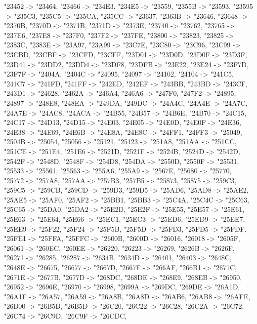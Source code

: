 {  "23452 -> "23464,
  "23466 -> "234E3,
  "234E5 -> "23559,
  "2355B -> "23593,
  "23595 -> "235C3,
  "235C5 -> "235CA,
  "235CC -> "23637,
  "2363B -> "23646,
  "23648 -> "2370B,
  "2370D -> "2371B,
  "2371D -> "2373E,
  "23740 -> "23762,
  "23765 -> "237E6,
  "237E8 -> "237F0,
  "237F2 -> "237FE,
  "23800 -> "23823,
  "23825 -> "2383C,
  "2383E -> "23A97,
  "23A99 -> "23C7E,
  "23C80 -> "23C96,
  "23C99 -> "23CBD,
  "23CBF -> "23CFD,
  "23CFF,
  "23D01 -> "23D0D,
  "23D0F -> "23D3F,
  "23D41 -> "23DD2,
  "23DD4 -> "23DF8,
  "23DFB -> "23E22,
  "23E24 -> "23F7D,
  "23F7F -> "2404A,
  "2404C -> "24095,
  "24097 -> "24102,
  "24104 -> "241C5,
  "241C7 -> "241FD,
  "241FF -> "242ED,
  "242EF -> "243BB,
  "243BD -> "243CF,
  "243D1 -> "24628,
  "2462A -> "246A4,
  "246A6 -> "247F0,
  "247F2 -> "24895,
  "24897 -> "248E8,
  "248EA -> "249DA,
  "249DC -> "24A4C,
  "24A4E -> "24A7C,
  "24A7E -> "24AC8,
  "24ACA -> "24B55,
  "24B57 -> "24B6E,
  "24B70 -> "24C15,
  "24C17 -> "24D13,
  "24D15 -> "24E03,
  "24E05 -> "24E0D,
  "24E0F -> "24E36,
  "24E38 -> "24E69,
  "24E6B -> "24E8A,
  "24E8C -> "24FF1,
  "24FF3 -> "25049,
  "2504B -> "25054,
  "25056 -> "25121,
  "25123 -> "251A8,
  "251AA -> "251CC,
  "251CE -> "251E4,
  "251E6 -> "2521D,
  "2521F -> "2524B,
  "2524D -> "2542D,
  "2542F -> "2548D,
  "2548F -> "254D8,
  "254DA -> "2550D,
  "2550F -> "25531,
  "25533 -> "25561,
  "25563 -> "255A6,
  "255A9 -> "2567E,
  "25680 -> "25770,
  "25772 -> "257A8,
  "257AA -> "257B3,
  "257B5 -> "25873,
  "25875 -> "259C3,
  "259C5 -> "259CB,
  "259CD -> "259D3,
  "259D5 -> "25AD6,
  "25AD8 -> "25AE2,
  "25AE5 -> "25AF0,
  "25AF2 -> "25BB1,
  "25BB3 -> "25C4A,
  "25C4C -> "25C63,
  "25C65 -> "25DA0,
  "25DA2 -> "25E2D,
  "25E2F -> "25E55,
  "25E57 -> "25E61,
  "25E63 -> "25E64,
  "25E66 -> "25EC1,
  "25EC3 -> "25ED6,
  "25ED9 -> "25EE7,
  "25EE9 -> "25F22,
  "25F24 -> "25F5B,
  "25F5D -> "25FD3,
  "25FD5 -> "25FDF,
  "25FE1 -> "25FFA,
  "25FFC -> "2600B,
  "2600D -> "26016,
  "26018 -> "2605F,
  "26061 -> "260EC,
  "260EE -> "26220,
  "26223 -> "26269,
  "2626B -> "2626F,
  "26271 -> "26285,
  "26287 -> "2634B,
  "2634D -> "26401,
  "26403 -> "2648C,
  "2648E -> "26675,
  "26677 -> "2667D,
  "2667F -> "266AF,
  "266B1 -> "2671C,
  "2671E -> "2677B,
  "2677D -> "268DC,
  "268DE -> "268E9,
  "268EB -> "26950,
  "26952 -> "2696E,
  "26970 -> "26998,
  "2699A -> "269DC,
  "269DE -> "26A1D,
  "26A1F -> "26A57,
  "26A59 -> "26A8B,
  "26A8D -> "26AB6,
  "26AB8 -> "26AFE,
  "26B00 -> "26B5B,
  "26B5D -> "26C20,
  "26C22 -> "26C28,
  "26C2A -> "26C72,
  "26C74 -> "26C9D,
  "26C9F -> "26CDC,
}
